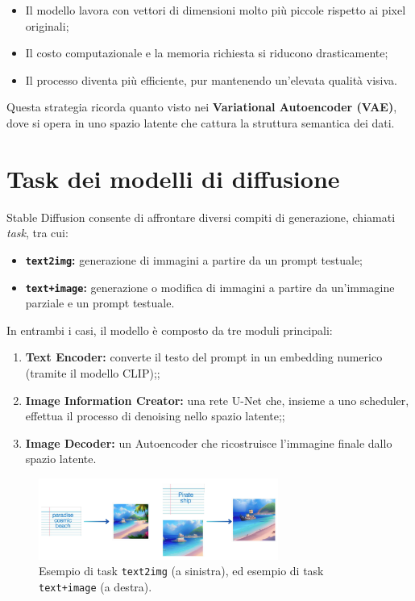 \begin{itemize}
    \item Il modello lavora con vettori di dimensioni molto più piccole rispetto ai pixel originali;
    \item Il costo computazionale e la memoria richiesta si riducono drasticamente;
    \item Il processo diventa più efficiente, pur mantenendo un'elevata qualità visiva.
\end{itemize}

Questa strategia ricorda quanto visto nei \textbf{Variational Autoencoder (VAE)}, dove si opera in uno spazio latente che cattura la struttura semantica dei dati.

\section{Task dei modelli di diffusione}

Stable Diffusion consente di affrontare diversi compiti di generazione, chiamati \textit{task}, tra cui:
\begin{itemize}
    \item \textbf{\texttt{text2img}:} generazione di immagini a partire da un prompt testuale;
    \item \textbf{\texttt{text+image}:} generazione o modifica di immagini a partire da un’immagine parziale e un prompt testuale.
\end{itemize}

In entrambi i casi, il modello è composto da tre moduli principali:
\begin{enumerate}
    \item \textbf{Text Encoder:} converte il testo del prompt in un embedding numerico (tramite il modello CLIP);;
    \item \textbf{Image Information Creator:} una rete U-Net che, insieme a uno scheduler, effettua il processo di denoising nello spazio latente;;
    \item \textbf{Image Decoder:} un Autoencoder che ricostruisce l’immagine finale dallo spazio latente.
\end{enumerate}

\begin{figure}[hbtp]
    \centering
    \includegraphics[width=0.7\textwidth]{figure/t2imgAndtextandtext}
    \caption{Esempio di task \texttt{text2img} (a sinistra), ed esempio di task \texttt{text+image} (a destra).}
    \label{fig:stabDiff}
\end{figure}

